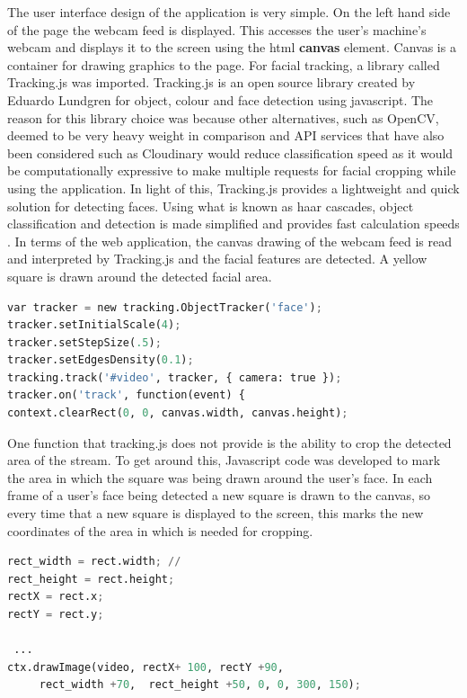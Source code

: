 The user interface design of the application is very simple. On the left hand side of the page the webcam feed is displayed. This accesses the user's machine's webcam and displays it to the screen using the html \textbf{canvas} element. Canvas is a container for drawing graphics to the page. For facial tracking, a library called Tracking.js was imported. Tracking.js is an open source library created by Eduardo Lundgren for object, colour and face detection using javascript. The reason for this library choice was because other alternatives, such as OpenCV, deemed to be very heavy weight in comparison and API services that have also been considered such as Cloudinary would reduce classification speed as it would be computationally expressive to make multiple requests for facial cropping while using the application. 
In light of this, Tracking.js provides a lightweight and quick solution for detecting faces. Using what is known as haar cascades, object classification and detection is made simplified and provides fast calculation speeds \citep{viola}. In terms of the web application, the canvas drawing of the webcam feed is read and interpreted by Tracking.js and the facial features are detected. A yellow square is drawn around the detected facial area.

\begin{lstlisting}[language=python, frame=single]
var tracker = new tracking.ObjectTracker('face');
tracker.setInitialScale(4);
tracker.setStepSize(.5);
tracker.setEdgesDensity(0.1);
tracking.track('#video', tracker, { camera: true });
tracker.on('track', function(event) {
context.clearRect(0, 0, canvas.width, canvas.height);
\end{lstlisting}

One function that tracking.js does not provide is the ability to crop the detected area of the stream. To get around this, Javascript code was developed to mark the area in which the square was being drawn around the user's face. In each frame of a user's face being detected a new square is drawn to the canvas, so every time that a new square is displayed to the screen, this marks the new coordinates of the area in which is needed for cropping. 

\begin{lstlisting}[language=python, frame=single]
rect_width = rect.width; // 
rect_height = rect.height;
rectX = rect.x;
rectY = rect.y;

 ...
ctx.drawImage(video, rectX+ 100, rectY +90,
	 rect_width +70,  rect_height +50, 0, 0, 300, 150);
\end{lstlisting}

